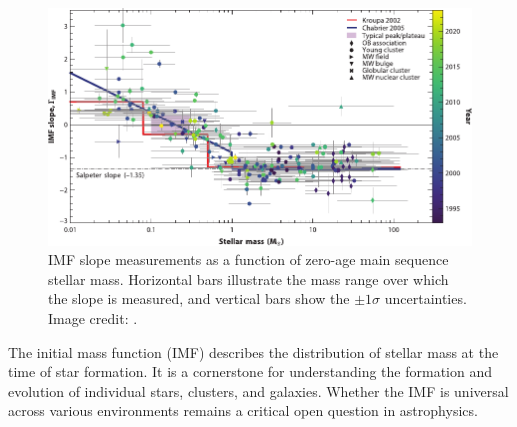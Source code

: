 \documentclass[12pt]{ucsddissertation}
\begin{document}
\begin{CJK*}{UTF8}{gbsn}
\begin{figure}[htb!]
    \centering
    \includegraphics[width=\linewidth]{figures/intro/IMF.pdf}
    \caption[IMF slope measurements as a function of zero-age main sequence stellar mass]{IMF slope measurements as a function of zero-age main sequence stellar mass. Horizontal bars illustrate the mass range over which the slope is measured, and vertical bars show the $\pm 1\sigma$ uncertainties. Image credit: \citet{Hennebelle-2024}.}
    \label{fig:imf-compilation}
\end{figure}

The initial mass function (IMF) describes the distribution of stellar mass at the time of star formation. It is a cornerstone for understanding the formation and evolution of individual stars, clusters, and galaxies. Whether the IMF is universal across various environments remains a critical open question in astrophysics. 


\end{CJK*}
\end{document}
